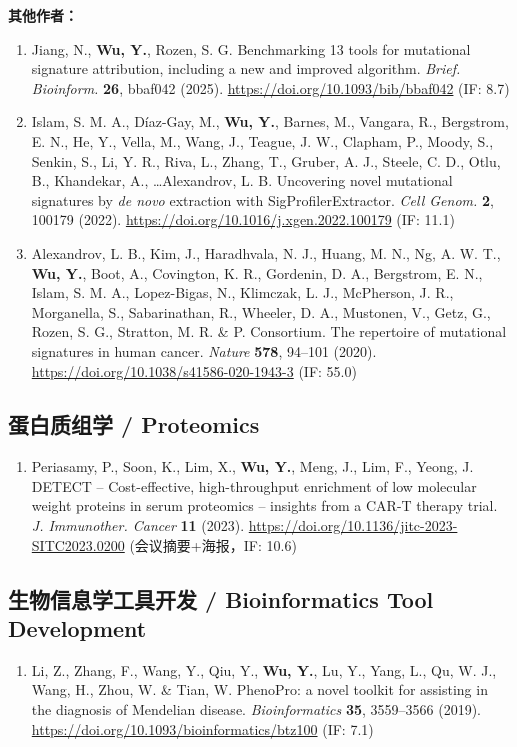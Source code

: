 \documentclass[11pt,a4paper]{article}
\newcommand{\urltext}[1]{\href{#1}{#1}}
\begin{document}
\textbf{其他作者：}

\begin{enumerate}[leftmargin=*,nosep,resume]
\item Jiang, N., \textbf{Wu, Y.}, Rozen, S. G. Benchmarking 13 tools for mutational signature attribution, including a new and improved algorithm. \textit{Brief. Bioinform.} \textbf{26}, bbaf042 (2025). \urltext{https://doi.org/10.1093/bib/bbaf042} (IF: 8.7)

\item Islam, S. M. A., Díaz-Gay, M., \textbf{Wu, Y.}, Barnes, M., Vangara, R., Bergstrom, E. N., He, Y., Vella, M., Wang, J., Teague, J. W., Clapham, P., Moody, S., Senkin, S., Li, Y. R., Riva, L., Zhang, T., Gruber, A. J., Steele, C. D., Otlu, B., Khandekar, A., \ldots Alexandrov, L. B. Uncovering novel mutational signatures by \textit{de novo} extraction with SigProfilerExtractor. \textit{Cell Genom.} \textbf{2}, 100179 (2022). \urltext{https://doi.org/10.1016/j.xgen.2022.100179} (IF: 11.1)

\item Alexandrov, L. B., Kim, J., Haradhvala, N. J., Huang, M. N., Ng, A. W. T., \textbf{Wu, Y.}, Boot, A., Covington, K. R., Gordenin, D. A., Bergstrom, E. N., Islam, S. M. A., Lopez-Bigas, N., Klimczak, L. J., McPherson, J. R., Morganella, S., Sabarinathan, R., Wheeler, D. A., Mustonen, V., Getz, G., Rozen, S. G., Stratton, M. R. \& P. Consortium. The repertoire of mutational signatures in human cancer. \textit{Nature} \textbf{578}, 94--101 (2020). \urltext{https://doi.org/10.1038/s41586-020-1943-3} (IF: 55.0)
\end{enumerate}

\subsection*{蛋白质组学 / Proteomics}

\begin{enumerate}[leftmargin=*,nosep,resume]
\item Periasamy, P., Soon, K., Lim, X., \textbf{Wu, Y.}, Meng, J., Lim, F., Yeong, J. DETECT -- Cost-effective, high-throughput enrichment of low molecular weight proteins in serum proteomics -- insights from a CAR-T therapy trial. \textit{J. Immunother. Cancer} \textbf{11} (2023). \urltext{https://doi.org/10.1136/jitc-2023-SITC2023.0200} (会议摘要+海报，IF: 10.6)
\end{enumerate}

\subsection*{生物信息学工具开发 / Bioinformatics Tool Development}

\begin{enumerate}[leftmargin=*,nosep,resume]
\item Li, Z., Zhang, F., Wang, Y., Qiu, Y., \textbf{Wu, Y.}, Lu, Y., Yang, L., Qu, W. J., Wang, H., Zhou, W. \& Tian, W. PhenoPro: a novel toolkit for assisting in the diagnosis of Mendelian disease. \textit{Bioinformatics} \textbf{35}, 3559--3566 (2019). \urltext{https://doi.org/10.1093/bioinformatics/btz100} (IF: 7.1)
\end{enumerate}
\end{document}
